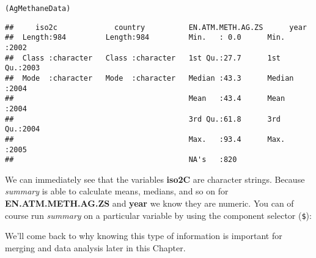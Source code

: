 {\small
\begin{knitrout}
\color{fgcolor}\begin{kframe}
\begin{alltt}
(AgMethaneData)
\end{alltt}
\begin{verbatim}
##     iso2c             country          EN.ATM.METH.AG.ZS      year     
##  Length:984         Length:984         Min.   : 0.0      Min.   :2002  
##  Class :character   Class :character   1st Qu.:27.7      1st Qu.:2003  
##  Mode  :character   Mode  :character   Median :43.3      Median :2004  
##                                        Mean   :43.4      Mean   :2004  
##                                        3rd Qu.:61.8      3rd Qu.:2004  
##                                        Max.   :93.4      Max.   :2005  
##                                        NA's   :820
\end{verbatim}
\end{kframe}
\end{knitrout}

}

\noindent We can immediately see that the variables \textbf{iso2C} are character strings. Because \emph{summary} is able to calculate means, medians, and so on for \textbf{EN.ATM.METH.AG.ZS} and \textbf{year} we know they are numeric. You can of course run \emph{summary} on a particular variable by using the component selector (\verb|$|):

\begin{knitrout}
\color{fgcolor}
\end{knitrout}


\noindent We'll come back to why knowing this type of information is important for merging and data analysis later in this Chapter.

